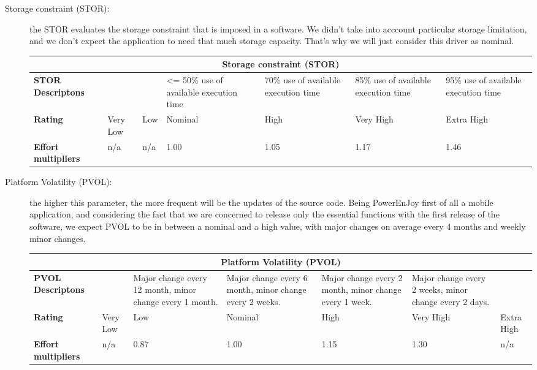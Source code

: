 \begin{description}
\item[Storage constraint (STOR):] the STOR evaluates the storage constraint that is imposed in a software. We didn't take into acccount particular storage limitation, and we don't expect the application to need that much storage capacity. That's why we will just consider this driver as nominal.

\begin{tabular}{|p{}|p{}|p{}|p{}|p{}|p{}|p{}|}
\hline
         \multicolumn{7}{|c|}{\textbf{Storage constraint (STOR)}} \\ \hline  \hline
         	\textbf{STOR Descriptons} & & & <= 50\% use of available execution time& 70\% use of available execution time& 85\% use of available execution time &95\% use of available execution time\\ \hline
	\textbf{Rating}&Very Low & Low & Nominal  & High & Very High &Extra High\\ \hline
	\textbf{Effort multipliers} & n/a & n/a & 1.00 & 1.05 & 1.17 & 1.46 \\ \hline
\end{tabular}

\item[Platform Volatility (PVOL):] the higher this parameter, the more frequent will be the updates of the source code. Being PowerEnJoy first of all a mobile application, and considering the fact that we are concerned to release only the essential functions with the first release of the software, we expect PVOL to be in between a nominal and a high value, with major changes on average every 4 months and weekly minor changes.

\begin{tabular}{|p{}|p{}|p{}|p{}|p{}|p{}|p{}|}
\hline
         \multicolumn{7}{|c|}{\textbf{Platform Volatility (PVOL)}} \\ \hline  \hline
         	\textbf{PVOL Descriptons} & & Major change every 12 month, minor change every 1 month.&Major change every 6 month, minor change every 2 weeks.&Major change every 2 month, minor change every 1 week.& Major change every 2 weeks, minor change every 2 days. & \\ \hline
	\textbf{Rating}&Very Low & Low & Nominal  & High & Very High &Extra High\\ \hline
	\textbf{Effort multipliers} & n/a & 0.87 & 1.00 & 1.15 & 1.30 & n/a \\ \hline
\end{tabular}


\end{description}
